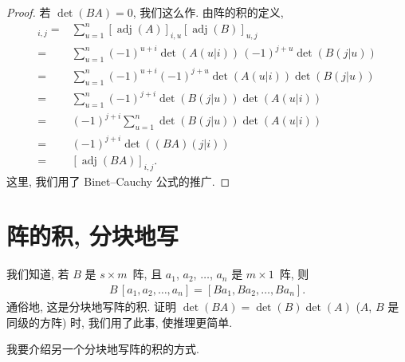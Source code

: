 \documentclass[../libro.tex]{subfiles}
\begin{document}
\begin{proof}
    若 \(\det {(BA)} = 0\), 我们这么作.
    由阵的积的定义,
    \begin{align*}
        [\operatorname{adj} {(A)} \operatorname{adj} {(B)}]_{i,j}
        = {} &
        \sum_{u = 1}^{n}
        {[\operatorname{adj} {(A)}]_{i,u}
        [\operatorname{adj} {(B)}]_{u,j}}
        \\
        = {} &
        \sum_{u = 1}^{n}
        {(-1)^{u+i} \det {(A(u|i))}\,
        (-1)^{j+u} \det {(B(j|u))}}
        \\
        = {} &
        \sum_{u = 1}^{n}
        {(-1)^{u+i} (-1)^{j+u}
        \det {(A(u|i))} \det {(B(j|u))}}
        \\
        = {} &
        \sum_{u = 1}^{n}
        {(-1)^{j+i} \det {(B(j|u))} \det {(A(u|i))}}
        \\
        = {} &
        (-1)^{j+i}
        \sum_{u = 1}^{n}
        {\det {(B(j|u))} \det {(A(u|i))}}
        \\
        = {} &
        (-1)^{j+i}
        \det {((BA)(j|i))}
        \\
        = {} &
        [\operatorname{adj} {(BA)}]_{i,j}.
    \end{align*}
    这里, 我们用了 Binet--Cauchy 公式的推广.
\end{proof}

\section{阵的积, 分块地写}

我们知道, 若 \(B\) 是 \(s \times m\)~阵,
且 \(a_1\), \(a_2\), \(\dots\), \(a_n\)
是 \(m \times 1\)~阵,
则
\begin{align*}
    B\,[a_1, a_2, \dots, a_n] = [Ba_1, Ba_2, \dots, Ba_n].
\end{align*}
通俗地, 这是分块地写阵的积.
证明 \(\det {(BA)} = \det {(B)} \det {(A)}\)
(\(A\), \(B\) 是同级的方阵) 时,
我们用了此事, 使推理更简单.

我要介绍另一个分块地写阵的积的方式.
\end{document}
